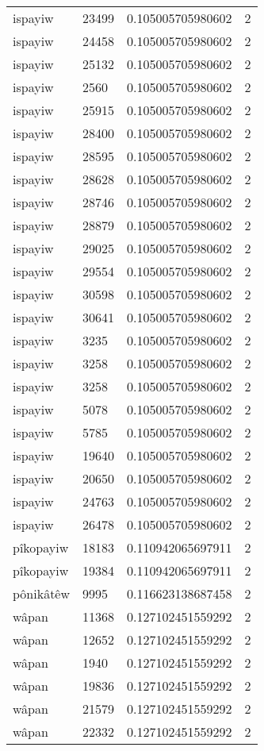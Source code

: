 \begin{longtable}{llll}
ispayiw & 23499 & 0.105005705980602 & 2 \\
ispayiw & 24458 & 0.105005705980602 & 2 \\
ispayiw & 25132 & 0.105005705980602 & 2 \\
ispayiw & 2560 & 0.105005705980602 & 2 \\
ispayiw & 25915 & 0.105005705980602 & 2 \\
ispayiw & 28400 & 0.105005705980602 & 2 \\
ispayiw & 28595 & 0.105005705980602 & 2 \\
ispayiw & 28628 & 0.105005705980602 & 2 \\
ispayiw & 28746 & 0.105005705980602 & 2 \\
ispayiw & 28879 & 0.105005705980602 & 2 \\
ispayiw & 29025 & 0.105005705980602 & 2 \\
ispayiw & 29554 & 0.105005705980602 & 2 \\
ispayiw & 30598 & 0.105005705980602 & 2 \\
ispayiw & 30641 & 0.105005705980602 & 2 \\
ispayiw & 3235 & 0.105005705980602 & 2 \\
ispayiw & 3258 & 0.105005705980602 & 2 \\
ispayiw & 3258 & 0.105005705980602 & 2 \\
ispayiw & 5078 & 0.105005705980602 & 2 \\
ispayiw & 5785 & 0.105005705980602 & 2 \\
ispayiw & 19640 & 0.105005705980602 & 2 \\
ispayiw & 20650 & 0.105005705980602 & 2 \\
ispayiw & 24763 & 0.105005705980602 & 2 \\
ispayiw & 26478 & 0.105005705980602 & 2 \\
pîkopayiw & 18183 & 0.110942065697911 & 2 \\
pîkopayiw & 19384 & 0.110942065697911 & 2 \\
pônikâtêw & 9995 & 0.116623138687458 & 2 \\
wâpan & 11368 & 0.127102451559292 & 2 \\
wâpan & 12652 & 0.127102451559292 & 2 \\
wâpan & 1940 & 0.127102451559292 & 2 \\
wâpan & 19836 & 0.127102451559292 & 2 \\
wâpan & 21579 & 0.127102451559292 & 2 \\
wâpan & 22332 & 0.127102451559292 & 2 \\

\end{longtable}
